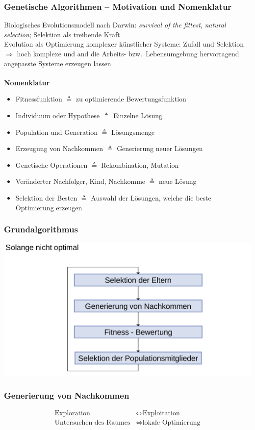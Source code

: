 \subsubsection{Genetische Algorithmen -- Motivation und Nomenklatur}
Biologisches Evolutionsmodell nach Darwin: \emph{survival of the fittest}, \emph{natural selection}; Selektion als treibende Kraft\\
Evolution als Optimierung komplexer künstlicher Systeme: Zufall und Selektion $\Rightarrow$ hoch komplexe und and die Arbeits- bzw.\ Lebensumgebung hervorragend angepasste Systeme erzeugen lassen \\\\
\textbf{Nomenklatur}
\begin{itemize}
	\item Fitnessfunktion $\triangleq$ zu optimierende Bewertungsfunktion
	\item Individuum oder Hypothese $\triangleq$ Einzelne Lösung
	\item Population und Generation $\triangleq$ Lösungsmenge
	\item Erzeugung von Nachkommen $\triangleq$ Generierung neuer Lösungen
	\item Genetische Operationen $\triangleq$ Rekombination, Mutation
	\item Veränderter Nachfolger, Kind, Nachkomme $\triangleq$ neue Lösung
	\item Selektion der Besten $\triangleq$ Auswahl der Lösungen, welche die beste Optimierung erzeugen
\end{itemize}

\subsubsection{Grundalgorithmus}
\includegraphics[width=.7\textwidth]{figures/grundalgorithmus.png}

\subsubsection{Generierung von Nachkommen}
\begin{align*}
	\text{Exploration} & \Leftrightarrow \text{Exploitation} \\
	\text{Untersuchen des Raumes} & \Leftrightarrow \text{lokale Optimierung}
\end{align*}

